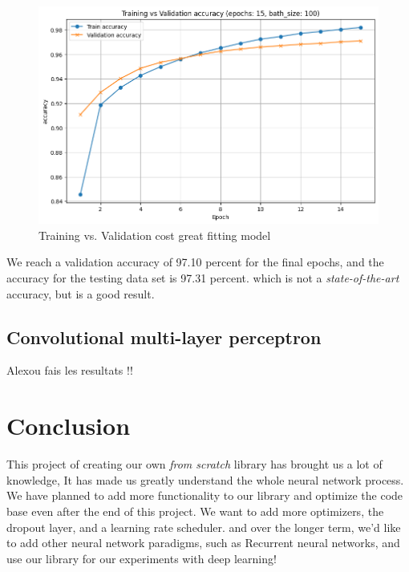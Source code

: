 \documentclass[a4paper, twocolumn, twoside]{article}
\begin{document}
	\begin{figure}[H]
		\begin{center}
			\includegraphics[width=\columnwidth]{images/accuracy_greatfit.png}
		\end{center}
		\caption{Training vs. Validation cost great fitting model}\label{fig:accuracy_greatfit}
	\end{figure}
	We reach a validation accuracy of 97.10 percent for the final epochs, and the accuracy for the testing data set is 97.31 percent.
	which is not a \textit{state-of-the-art} accuracy, but is a good result.
	\subsection{Convolutional multi-layer perceptron}
        Alexou fais les resultats !!
	\section{Conclusion}
	This project of creating our own \textit{from scratch} library has brought us a lot of knowledge,
	It has made us greatly understand the whole neural network process.
	We have planned to add more functionality to our library and optimize the code base even after the end of this project.
	We want to add more optimizers, the dropout layer, and a learning rate scheduler.
	and over the longer term, we'd like to add other neural network paradigms, such as Recurrent neural networks, and use our library for our experiments with deep learning!
	\nocite{*}
	\printbibliography
\end{document}
